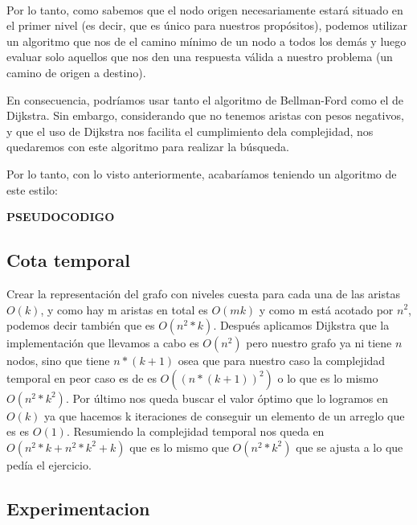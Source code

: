 \\
\par
Por lo tanto, como sabemos que el nodo origen necesariamente estará situado en el primer nivel (es decir, que es único para nuestros propósitos), podemos utilizar un algoritmo que nos de el camino mínimo de un nodo a todos los demás y luego evaluar solo aquellos que nos den una respuesta válida a nuestro problema (un camino de origen a destino).
\\
\par
En consecuencia, podríamos usar tanto el algoritmo de Bellman-Ford como el de Dijkstra. Sin embargo, considerando que no tenemos aristas con pesos negativos, y que el uso de Dijkstra nos facilita el cumplimiento dela complejidad, nos quedaremos con este algoritmo para realizar la búsqueda.
\\
\par
Por lo tanto, con lo visto anteriormente, acabaríamos teniendo un algoritmo de este estilo:
\\
\par
\textbf{PSEUDOCODIGO}

\subsection{Cota temporal}
Crear la representación del grafo con niveles cuesta para cada una de las aristas $O(k)$, y como hay m aristas en total es $O(mk)$ y como m está acotado por $n^2$, podemos decir también que es $O(n^2*k)$. Después aplicamos Dijkstra que la implementación que llevamos a cabo es $O(n^2)$ pero nuestro grafo ya ni tiene $n$ nodos, sino que tiene $n*(k+1)$ osea que para nuestro caso la complejidad temporal en peor caso es de es $O((n*(k+1))^2)$ o lo que es lo mismo $O(n^2*k^2)$. Por último nos queda buscar el valor óptimo que lo logramos en $O(k)$ ya que hacemos k iteraciones de conseguir un elemento de un arreglo que es es $O(1)$. Resumiendo la complejidad temporal nos queda en $O( n^2*k + n^2*k^2 + k )$ que es lo mismo que $O(n^2*k^2)$ que se ajusta a lo que pedía el ejercicio.

\subsection{Experimentacion}

\pagebreak